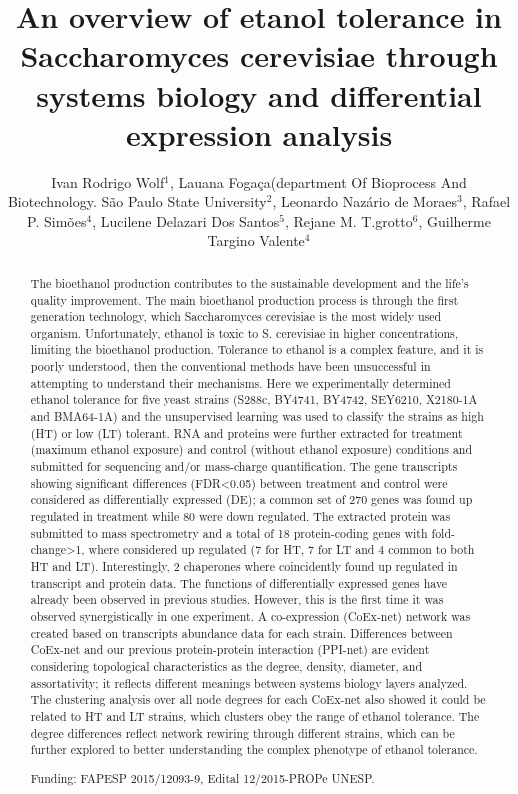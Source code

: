 \documentclass[twoside]{article}
\title{\vspace{-15mm}\fontsize{24pt}{10pt}\selectfont\textbf{An overview of etanol tolerance in Saccharomyces cerevisiae through systems biology and differential expression analysis}} %
\author{Ivan Rodrigo Wolf$^1$, Lauana Foga\c{c}a(department Of Bioprocess And Biotechnology. S\~ao Paulo State University$^2$, Leonardo Naz\'ario de Moraes$^3$, Rafael P. Sim\~oes$^4$, Lucilene Delazari Dos Santos$^5$, Rejane M. T.grotto$^6$, Guilherme Targino Valente$^4$}
\affil{1 FCA-UNESP\\ 2 UNESP\\ 3 DEPARTMENT OF BIOPROCESS AND BIOTECHNOLOGY. S\~AO PAULO STATE UNIVERSITY\\ 4 UNESP - STATE USP\\ 5 CENTER FOR THE STUDY OF VENOMS AND POISONOUS ANIMALS , S\~AO PAULO STATE UNIVERSITY\\ 6 DEPARTMENT OF BIOPROCESS AND BIOTECHNOLOGY, S\~AO PAULO STATE UNIVERSITY, BOTUCATU\\ }
\date{}
\begin{document}
\maketitle %

\thispagestyle{fancy} %


\begin{abstract}
The bioethanol production contributes to the sustainable development and the life's quality improvement. The main bioethanol production process is through the first generation technology, which Saccharomyces cerevisiae is the most widely used organism. Unfortunately, ethanol is toxic to S. cerevisiae in higher concentrations, limiting the bioethanol production. Tolerance to ethanol is a complex feature, and it is poorly understood, then the conventional methods have been unsuccessful in attempting to understand their mechanisms. Here we experimentally determined ethanol tolerance for five yeast strains (S288c, BY4741, BY4742, SEY6210, X2180-1A and BMA64-1A) and the unsupervised learning was used to classify the strains as high (HT) or low (LT) tolerant. RNA and proteins were further extracted for treatment (maximum ethanol exposure) and control (without ethanol exposure) conditions and submitted for sequencing and/or mass-charge quantification. The gene transcripts showing significant differences (FDR<0.05) between treatment and control were considered as differentially expressed (DE); a common set of 270 genes was found up regulated in treatment while 80 were down regulated. The extracted protein was submitted to mass spectrometry and a total of 18 protein-coding genes with fold-change>1, where considered up regulated (7 for HT, 7 for LT and 4 common to both HT and LT). Interestingly, 2 chaperones where coincidently found up regulated in transcript and protein data. The functions of differentially expressed genes have already been observed in previous studies. However, this is the first time it was observed synergistically in one experiment. A co-expression (CoEx-net) network was created based on transcripts abundance data for each strain. Differences between CoEx-net and our previous protein-protein interaction (PPI-net) are evident considering topological characteristics as the degree, density, diameter, and assortativity; it reflects different meanings between systems biology layers analyzed. The clustering analysis over all node degrees for each CoEx-net also showed it could be related to HT and LT strains, which clusters obey the range of ethanol tolerance. The degree differences reflect network rewiring through different strains, which can be further explored to better understanding the complex phenotype of ethanol tolerance.

Funding: FAPESP 2015/12093-9, Edital 12/2015-PROPe UNESP.
\end{abstract}
\end{document}
